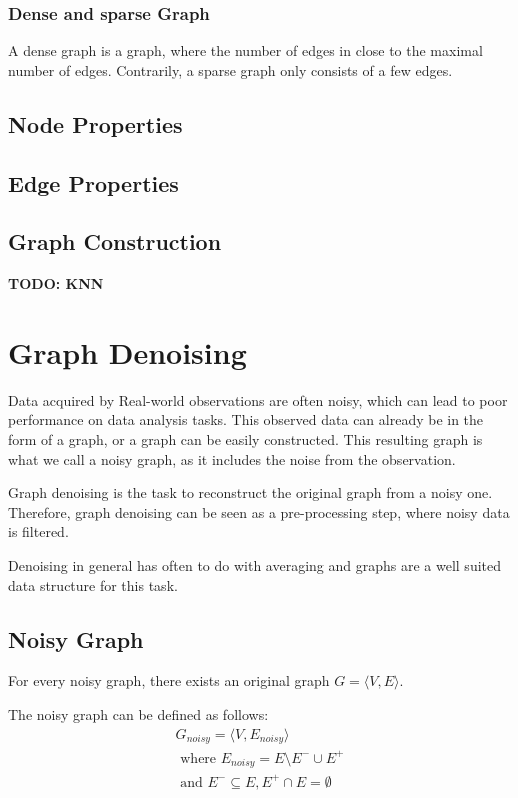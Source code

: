 \subsubsection{Dense and sparse Graph}
A dense graph is a graph, where the number of edges in close to the maximal number of edges.
Contrarily, a sparse graph only consists of a few edges.



\subsection{Node Properties}
\subsection{Edge Properties}

\subsection{Graph Construction}
\textbf{TODO: KNN}



\section{Graph Denoising}
Data acquired by Real-world observations are often noisy, which can lead to poor 
performance on data analysis tasks. This observed data can already be in the form of a graph,
or a graph can be easily constructed. This resulting graph is what we call
a noisy graph, as it includes the noise from the observation.

Graph denoising is the task to reconstruct the original graph from a noisy one.
Therefore, graph denoising can be seen as a pre-processing step, where noisy data is filtered.

Denoising in general has often to do with averaging \cite{noneLocalMean}
 and graphs are  a well suited data structure for this task.

\subsection{Noisy Graph}
For every noisy graph, there exists an original graph $G = \langle V,E \rangle$.

The noisy graph can be defined as follows:
\begin{equation}
    \begin{aligned}
        G_{noisy} = \langle V,E_{noisy} \rangle \\ 
        \text{ where }  E_{noisy} = E \setminus  E^{-} \cup  E^{+} \\ 
        \text{ and } E^{-} \subseteq E  ,  E^{+} \cap E = \emptyset
    \end{aligned}
\end{equation}

